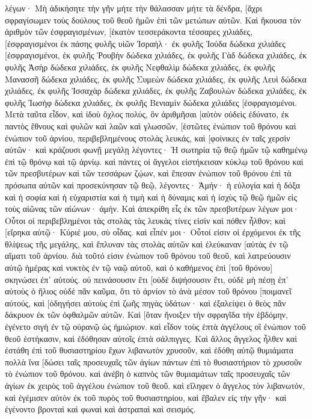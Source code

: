 λέγων· Μὴ ἀδικήσητε τὴν γῆν μήτε τὴν θάλασσαν μήτε τὰ δένδρα, [ἄχρι σφραγίσωμεν τοὺς δούλους τοῦ θεοῦ ἡμῶν ἐπὶ τῶν μετώπων αὐτῶν. 
Καὶ ἤκουσα τὸν ἀριθμὸν τῶν ἐσφραγισμένων, [ἑκατὸν τεσσεράκοντα τέσσαρες χιλιάδες, [ἐσφραγισμένοι ἐκ πάσης φυλῆς υἱῶν Ἰσραήλ· 
ἐκ φυλῆς Ἰούδα δώδεκα χιλιάδες [ἐσφραγισμένοι, ἐκ φυλῆς Ῥουβὴν δώδεκα χιλιάδες, ἐκ φυλῆς Γὰδ δώδεκα χιλιάδες, 
ἐκ φυλῆς Ἀσὴρ δώδεκα χιλιάδες, ἐκ φυλῆς Νεφθαλὶμ δώδεκα χιλιάδες, ἐκ φυλῆς Μανασσῆ δώδεκα χιλιάδες, 
ἐκ φυλῆς Συμεὼν δώδεκα χιλιάδες, ἐκ φυλῆς Λευὶ δώδεκα χιλιάδες, ἐκ φυλῆς Ἰσσαχὰρ δώδεκα χιλιάδες, 
ἐκ φυλῆς Ζαβουλὼν δώδεκα χιλιάδες, ἐκ φυλῆς Ἰωσὴφ δώδεκα χιλιάδες, ἐκ φυλῆς Βενιαμὶν δώδεκα χιλιάδες [ἐσφραγισμένοι. 
Μετὰ ταῦτα εἶδον, καὶ ἰδοὺ ὄχλος πολύς, ὃν ἀριθμῆσαι [αὐτὸν οὐδεὶς ἐδύνατο, ἐκ παντὸς ἔθνους καὶ φυλῶν καὶ λαῶν καὶ γλωσσῶν, [ἑστῶτες ἐνώπιον τοῦ θρόνου καὶ ἐνώπιον τοῦ ἀρνίου, περιβεβλημένους στολὰς λευκάς, καὶ [φοίνικες ἐν ταῖς χερσὶν αὐτῶν· 
καὶ κράζουσι φωνῇ μεγάλῃ λέγοντες· Ἡ σωτηρία τῷ θεῷ ἡμῶν τῷ καθημένῳ ἐπὶ τῷ θρόνῳ καὶ τῷ ἀρνίῳ. 
καὶ πάντες οἱ ἄγγελοι εἱστήκεισαν κύκλῳ τοῦ θρόνου καὶ τῶν πρεσβυτέρων καὶ τῶν τεσσάρων ζῴων, καὶ ἔπεσαν ἐνώπιον τοῦ θρόνου ἐπὶ τὰ πρόσωπα αὐτῶν καὶ προσεκύνησαν τῷ θεῷ, 
λέγοντες· Ἀμήν· ἡ εὐλογία καὶ ἡ δόξα καὶ ἡ σοφία καὶ ἡ εὐχαριστία καὶ ἡ τιμὴ καὶ ἡ δύναμις καὶ ἡ ἰσχὺς τῷ θεῷ ἡμῶν εἰς τοὺς αἰῶνας τῶν αἰώνων· ἀμήν. 
Καὶ ἀπεκρίθη εἷς ἐκ τῶν πρεσβυτέρων λέγων μοι· Οὗτοι οἱ περιβεβλημένοι τὰς στολὰς τὰς λευκὰς τίνες εἰσὶν καὶ πόθεν ἦλθον; 
καὶ [εἴρηκα αὐτῷ· Κύριέ μου, σὺ οἶδας. καὶ εἶπέν μοι· Οὗτοί εἰσιν οἱ ἐρχόμενοι ἐκ τῆς θλίψεως τῆς μεγάλης, καὶ ἔπλυναν τὰς στολὰς αὐτῶν καὶ ἐλεύκαναν [αὐτὰς ἐν τῷ αἵματι τοῦ ἀρνίου. 
διὰ τοῦτό εἰσιν ἐνώπιον τοῦ θρόνου τοῦ θεοῦ, καὶ λατρεύουσιν αὐτῷ ἡμέρας καὶ νυκτὸς ἐν τῷ ναῷ αὐτοῦ, καὶ ὁ καθήμενος ἐπὶ [τοῦ θρόνου] σκηνώσει ἐπ᾽ αὐτούς. 
οὐ πεινάσουσιν ἔτι [οὐδὲ διψήσουσιν ἔτι, οὐδὲ μὴ πέσῃ ἐπ᾽ αὐτοὺς ὁ ἥλιος οὐδὲ πᾶν καῦμα, 
ὅτι τὸ ἀρνίον τὸ ἀνὰ μέσον τοῦ θρόνου [ποιμανεῖ αὐτούς, καὶ [ὁδηγήσει αὐτοὺς ἐπὶ ζωῆς πηγὰς ὑδάτων· καὶ ἐξαλείψει ὁ θεὸς πᾶν δάκρυον ἐκ τῶν ὀφθαλμῶν αὐτῶν. 
Καὶ [ὅταν ἤνοιξεν τὴν σφραγῖδα τὴν ἑβδόμην, ἐγένετο σιγὴ ἐν τῷ οὐρανῷ ὡς ἡμιώριον. 
καὶ εἶδον τοὺς ἑπτὰ ἀγγέλους οἳ ἐνώπιον τοῦ θεοῦ ἑστήκασιν, καὶ ἐδόθησαν αὐτοῖς ἑπτὰ σάλπιγγες. 
Καὶ ἄλλος ἄγγελος ἦλθεν καὶ ἐστάθη ἐπὶ τοῦ θυσιαστηρίου ἔχων λιβανωτὸν χρυσοῦν, καὶ ἐδόθη αὐτῷ θυμιάματα πολλὰ ἵνα [δώσει ταῖς προσευχαῖς τῶν ἁγίων πάντων ἐπὶ τὸ θυσιαστήριον τὸ χρυσοῦν τὸ ἐνώπιον τοῦ θρόνου. 
καὶ ἀνέβη ὁ καπνὸς τῶν θυμιαμάτων ταῖς προσευχαῖς τῶν ἁγίων ἐκ χειρὸς τοῦ ἀγγέλου ἐνώπιον τοῦ θεοῦ. 
καὶ εἴληφεν ὁ ἄγγελος τὸν λιβανωτόν, καὶ ἐγέμισεν αὐτὸν ἐκ τοῦ πυρὸς τοῦ θυσιαστηρίου, καὶ ἔβαλεν εἰς τὴν γῆν· καὶ ἐγένοντο βρονταὶ καὶ φωναὶ καὶ ἀστραπαὶ καὶ σεισμός. 
